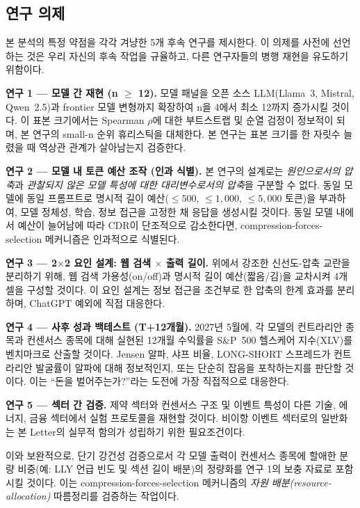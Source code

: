 \documentclass[11pt,letterpaper]{article}
\begin{document}
\subsection{연구 의제}

본 분석의 특정 약점을 각각 겨냥한 5개 후속 연구를 제시한다. 이 의제를 사전에 선언하는 것은 우리 자신의 후속 작업을 규율하고, 다른 연구자들의 병행 재현을 유도하기 위함이다.

\textbf{연구 1 --- 모델 간 재현 (n $\geq$ 12).} 모델 패널을 오픈 소스 LLM(Llama~3, Mistral, Qwen~2.5)과 frontier 모델 변형까지 확장하여 n을 4에서 최소 12까지 증가시킬 것이다. 이 표본 크기에서는 Spearman $\rho$에 대한 부트스트랩 및 순열 검정이 정보적이 되며, 본 연구의 small-n 순위 휴리스틱을 대체한다. 본 연구는 표본 크기를 한 자릿수 늘렸을 때 역상관 관계가 살아남는지 검증한다.

\textbf{연구 2 --- 모델 내 토큰 예산 조작 (인과 식별).} 본 연구의 설계로는 \textit{원인으로서의 압축}과 \textit{관찰되지 않은 모델 특성에 대한 대리변수로서의 압축}을 구분할 수 없다. 동일 모델에 동일 프롬프트로 명시적 길이 예산($\leq 500$, $\leq 1{,}000$, $\leq 5{,}000$ 토큰)을 부과하여, 모델 정체성, 학습, 정보 접근을 고정한 채 응답을 생성시킬 것이다. 동일 모델 내에서 예산이 늘어남에 따라 CDR이 단조적으로 감소한다면, compression-forces-selection 메커니즘은 인과적으로 식별된다.

\textbf{연구 3 --- 2$\times$2 요인 설계: 웹 검색 $\times$ 출력 길이.} 위에서 강조한 신선도-압축 교란을 분리하기 위해, 웹 검색 가용성(on/off)과 명시적 길이 예산(짧음/김)을 교차시켜 4개 셀을 구성할 것이다. 이 요인 설계는 정보 접근을 조건부로 한 압축의 한계 효과를 분리하며, ChatGPT 예외에 직접 대응한다.

\textbf{연구 4 --- 사후 성과 백테스트 (T+12개월).} 2027년 5월에, 각 모델의 컨트라리안 종목과 컨센서스 종목에 대해 실현된 12개월 수익률을 S\&P~500 헬스케어 지수(XLV)를 벤치마크로 산출할 것이다. Jensen 알파, 샤프 비율, LONG-SHORT 스프레드가 컨트라리안 발굴률이 알파에 대해 정보적인지, 또는 단순히 잡음을 포착하는지를 판단할 것이다. 이는 ``돈을 벌어주는가?''라는 도전에 가장 직접적으로 대응한다.

\textbf{연구 5 --- 섹터 간 검증.} 제약 섹터와 컨센서스 구조 및 이벤트 특성이 다른 기술, 에너지, 금융 섹터에서 실험 프로토콜을 재현할 것이다. 비이항 이벤트 섹터로의 일반화는 본 Letter의 실무적 함의가 성립하기 위한 필요조건이다.

이와 보완적으로, 단기 강건성 검증으로서 각 모델 출력이 컨센서스 종목에 할애한 분량 비중(예: LLY 언급 빈도 및 섹션 길이 배분)의 정량화를 연구 1의 보충 자료로 포함시킬 것이다. 이는 compression-forces-selection 메커니즘의 \textit{자원 배분(resource-allocation)} 따름정리를 검증하는 작업이다.
\end{document}
